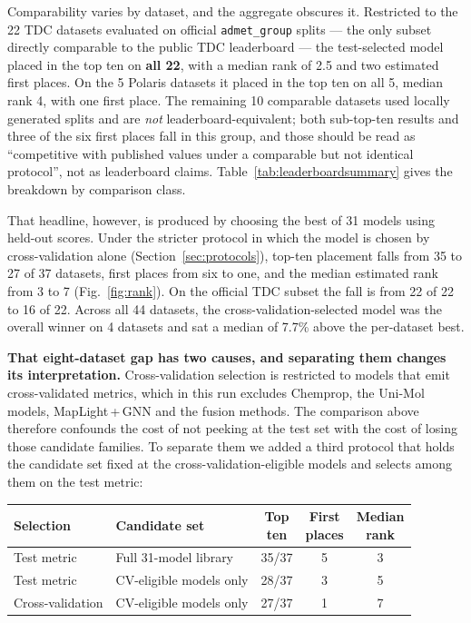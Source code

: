 Comparability varies by dataset, and the aggregate obscures it. Restricted to the 22 TDC datasets evaluated on official \texttt{admet\_group} splits --- the only subset directly comparable to the public TDC leaderboard --- the test-selected model placed in the top ten on \textbf{all 22}, with a median rank of 2.5 and two estimated first places. On the 5 Polaris datasets it placed in the top ten on all 5, median rank 4, with one first place. The remaining 10 comparable datasets used locally generated splits and are \emph{not} leaderboard-equivalent; both sub-top-ten results and three of the six first places fall in this group, and those should be read as ``competitive with published values under a comparable but not identical protocol'', not as leaderboard claims. Table~\ref{tab:leaderboardsummary} gives the breakdown by comparison class.



That headline, however, is produced by choosing the best of 31 models using held-out scores. Under the stricter protocol in which the model is chosen by cross-validation alone (Section~\ref{sec:protocols}), top-ten placement falls from 35 to 27 of 37 datasets, first places from six to one, and the median estimated rank from 3 to 7 (Fig.~\ref{fig:rank}). On the official TDC subset the fall is from 22 of 22 to 16 of 22. Across all 44 datasets, the cross-validation-selected model was the overall winner on 4 datasets and sat a median of 7.7\% above the per-dataset best.

\textbf{That eight-dataset gap has two causes, and separating them changes its interpretation.} Cross-validation selection is restricted to models that emit cross-validated metrics, which in this run excludes Chemprop, the Uni-Mol models, MapLight\,+\,GNN and the fusion methods. The comparison above therefore confounds the cost of not peeking at the test set with the cost of losing those candidate families. To separate them we added a third protocol that holds the candidate set fixed at the cross-validation-eligible models and selects among them on the test metric:

\begin{center}
\begin{tabularx}{\linewidth}{@{}>{\raggedright\arraybackslash}X>{\raggedright\arraybackslash}Xccc@{}}
\toprule
Selection & Candidate set & \makecell{Top\\ten} & \makecell{First\\places} & \makecell{Median\\rank} \\
\midrule
Test metric & Full 31-model library & 35/37 & 5 & 3 \\
Test metric & CV-eligible models only & 28/37 & 3 & 5 \\
Cross-validation & CV-eligible models only & 27/37 & 1 & 7 \\
\bottomrule
\end{tabularx}
\end{center}

